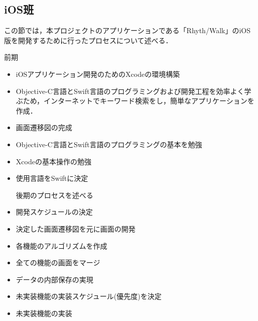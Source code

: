 \subsection{iOS班}
\par この節では，本プロジェクトのアプリケーションである「Rhyth/Walk」のiOS版を開発するために行ったプロセスについて述べる．
\par 前期
\begin{itemize}
\item iOSアプリケーション開発のためのXcodeの環境構築
\item Objective-C言語とSwift言語のプログラミングおよび開発工程を効率よく学ぶため，インターネットでキーワード検索をし，簡単なアプリケーションを作成．
\item 画面遷移図の完成
\item Objective-C言語とSwift言語のプログラミングの基本を勉強
\item Xcodeの基本操作の勉強
\item 使用言語をSwiftに決定

\par 後期のプロセスを述べる
\item 開発スケジュールの決定
\item 決定した画面遷移図を元に画面の開発
\item 各機能のアルゴリズムを作成
\item 全ての機能の画面をマージ
\item データの内部保存の実現
\item 未実装機能の実装スケジュール(優先度)を決定
\item 未実装機能の実装
 \end{itemize}
